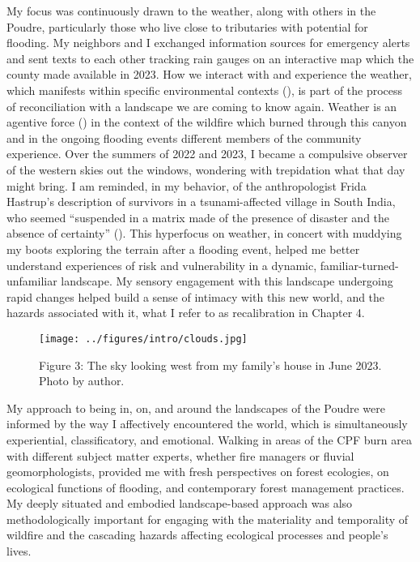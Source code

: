 \documentclass[
]{article}
\begin{document}
My focus was continuously drawn to the weather, along with others in the Poudre, particularly those who live close to tributaries with potential for flooding. My neighbors and I exchanged information sources for emergency alerts and sent texts to each other tracking rain gauges on an interactive map which the county made available in 2023. How we interact with and experience the weather, which manifests within specific environmental contexts (), is part of the process of reconciliation with a landscape we are coming to know again. Weather is an agentive force () in the context of the wildfire which burned through this canyon and in the ongoing flooding events different members of the community experience. Over the summers of 2022 and 2023, I became a compulsive observer of the western skies out the windows, wondering with trepidation what that day might bring. I am reminded, in my behavior, of the anthropologist Frida Hastrup's description of survivors in a tsunami-affected village in South India, who seemed ``suspended in a matrix made of the presence of disaster and the absence of certainty'' (). This hyperfocus on weather, in concert with muddying my boots exploring the terrain after a flooding event, helped me better understand experiences of risk and vulnerability in a dynamic, familiar-turned-unfamiliar landscape. My sensory engagement with this landscape undergoing rapid changes helped build a sense of intimacy with this new world, and the hazards associated with it, what I refer to as recalibration in Chapter 4.

\begin{figure}
\centering
\texttt{[image: ../figures/intro/clouds.jpg]}
\caption{Figure 3: The sky looking west from my family's house in June 2023. Photo by author.}
\end{figure}

My approach to being in, on, and around the landscapes of the Poudre were informed by the way I affectively encountered the world, which is simultaneously experiential, classificatory, and emotional. Walking in areas of the CPF burn area with different subject matter experts, whether fire managers or fluvial geomorphologists, provided me with fresh perspectives on forest ecologies, on ecological functions of flooding, and contemporary forest management practices. My deeply situated and embodied landscape-based approach was also methodologically important for engaging with the materiality and temporality of wildfire and the cascading hazards affecting ecological processes and people's lives.
\end{document}
